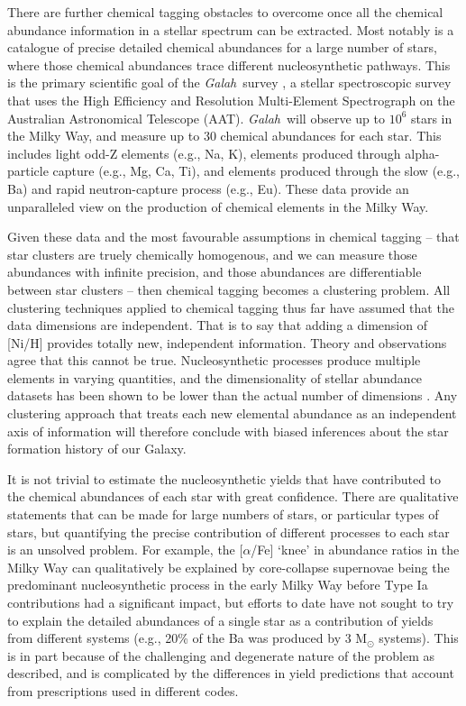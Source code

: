 \documentclass[twocolumn]{aastex62}
\newcommand{\project}[1]{\textsl{#1}}
\newcommand{\Galah}{\project{Galah}}
\begin{document}
There are further chemical tagging obstacles to overcome once all the chemical 
abundance information in a stellar spectrum can be extracted. Most notably is a 
catalogue of precise detailed chemical abundances for a large number of stars,
where those chemical abundances trace different nucleosynthetic pathways.
This is the primary scientific goal of the \Galah\ survey \citep{DeSilva:2015,Martell:2017,Buder:2018},
a stellar spectroscopic survey that uses the High Efficiency and Resolution 
Multi-Element Spectrograph \citep[\project{HERMES};][]{Sheinis:2015} on the Australian 
Astronomical Telescope (AAT).  \Galah\ will observe up to $10^6$ stars in the 
Milky Way, and measure up to 30 chemical abundances for each star. This includes
light odd-Z elements (e.g., Na, K), elements produced through
alpha-particle capture (e.g., Mg, Ca, Ti), and elements produced
through the slow (e.g., Ba) and rapid neutron-capture process
(e.g., Eu). These data provide an unparalleled view on the production
of chemical elements in the Milky Way.


Given these data and the most
favourable assumptions in chemical tagging -- that star clusters are truely
chemically homogenous, and we can measure those abundances with infinite precision,
and those abundances are differentiable between star clusters -- then chemical
tagging becomes a clustering problem. All clustering techniques applied to 
chemical tagging thus far have assumed that the data dimensions are independent. That is to say
that adding a dimension of [Ni/H] provides totally new, independent information.
Theory and observations agree that this cannot be true.
Nucleosynthetic processes produce multiple elements in varying
quantities, and the dimensionality of stellar abundance datasets has been shown
to be lower than the actual number of dimensions \citep{Ting:2012, Price-Jones:2018}.
Any clustering approach that treats each new elemental abundance as an 
independent axis of information will therefore conclude with biased inferences
about the star formation history of our Galaxy. 


It is not trivial to estimate
the nucleosynthetic yields that have contributed to the chemical abundances of each star
with great confidence. There are
qualitative statements that can be made for large numbers of stars, or particular
types of stars, but quantifying the precise contribution of different processes
to each star is an unsolved problem. For example, the [$\alpha$/Fe] `knee' in
abundance ratios in the Milky Way can qualitatively be explained by 
core-collapse supernovae being the predominant nucleosynthetic process in the
early Milky Way before Type Ia contributions had a significant impact, but 
efforts to date have not sought to try to explain the detailed abundances of a 
single star as a contribution of yields from different systems (e.g., 20\% of the
Ba was produced by 3 M$_\odot$ systems). This is in part because of the
challenging and degenerate nature of the problem as described, and is complicated
by the differences in yield predictions that account from prescriptions used in
different codes.
\end{document}
